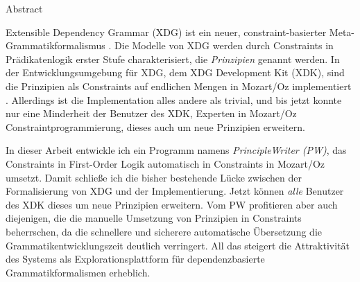 \begin{titlepage}
\pagebreak

\pagestyle{empty}

\begin{center}
  {\sfb\Large{Abstract}}
\end{center}

\vspace{10pt}

Extensible Dependency Grammar (XDG) ist ein neuer,
constraint-basierter Meta-Gram\-matikformalismus
\cite{Debusmann06}. Die Modelle von XDG werden durch Constraints in
Pr{\"a}dikatenlogik erster Stufe charakterisiert, die
\emph{Prinzipien} genannt werden. In der Entwicklungsumgebung f{\"u}r
XDG, dem XDG Development Kit (XDK), sind die Prinzipien als
Constraints auf endlichen Mengen in Mozart/Oz implementiert
\cite{Schulte02}. Allerdings ist die Implementation alles andere als
trivial, und bis jetzt konnte nur eine Minderheit der Benutzer des
XDK, Experten in Mozart/Oz Constraintprogrammierung, dieses auch um
neue Prinzipien erweitern.

In dieser Arbeit entwickle ich ein Programm namens
\emph{PrincipleWriter (PW)}, das Constraints in First-Order Logik
automatisch in Constraints in Mozart/Oz umsetzt. Damit schlie{\ss}e
ich die bisher bestehende L{\"u}cke zwischen der Formalisierung von
XDG und der Implementierung. Jetzt k{\"o}nnen \emph{alle} Benutzer des
XDK dieses um neue Prinzipien erweitern.  Vom PW profitieren aber auch
diejenigen, die die manuelle Umsetzung von Prinzipien in Constraints
beherrschen, da die schnellere und sicherere automatische
{\"U}bersetzung die Grammatikentwicklungszeit deutlich verringert.
All das steigert die Attraktivit{\"a}t des Systems als
Explorationsplattform f{\"u}r dependenzbasierte Grammatikformalismen
erheblich.

\pagebreak
\strut
\thispagestyle{empty}
\newpage


\pagestyle{empty}
\end{titlepage}
\cleardoublepage
